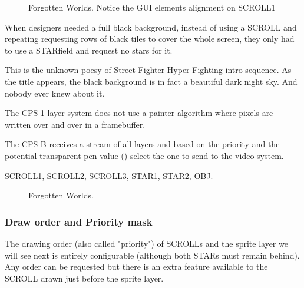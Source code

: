 \vfill
\begin{figure}[!b]
 \caption*{Forgotten Worlds. Notice the GUI elements alignment on SCROLL1}%
 \end{figure}%
\pagebreak





When designers needed a full black background, instead of using a SCROLL and repeating requesting rows of black tiles to cover the whole screen, they only had to use a STARfield and request no stars for it. 

This is the unknown poesy of Street Fighter Hyper Fighting intro sequence. As the title appears, the black background is in fact a beautiful dark night sky. And nobody ever knew about it.

\begin{trivia}
The CPS-1 layer system does not use a painter algorithm where pixels are written over and over in a framebuffer. 

The CPS-B receives a stream of all layers and based on the priority and the potential transparent pen value () select the one to send to the video system.
\end{trivia}


 SCROLL1,  SCROLL2,  SCROLL3,  STAR1,  STAR2,  OBJ.

\vfill
\begin{figure}[!b]
 \caption*{Forgotten Worlds.}%
 \end{figure}%
\pagebreak









\subsubsection{Draw order and Priority mask}\label{finalfight_trick}


The drawing order (also called "priority") of SCROLLs and the sprite layer we will see next is entirely configurable (although both STARs must remain behind). Any order can be requested but there is an extra feature available to the SCROLL drawn just before the sprite layer.

